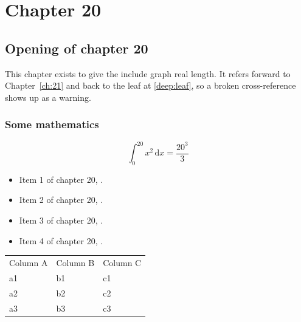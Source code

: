\chapter{Chapter 20}
\label{ch:20}
\section{Opening of chapter 20}
This chapter exists to give the include graph real length. It refers
forward to Chapter~\ref{ch:21} and back to the leaf
at \ref{deep:leaf}, so a broken cross-reference shows up as a warning.

\subsection{Some mathematics}
\begin{equation}
  \int_0^{20} x^{2} \, \mathrm{d}x = \frac{20^{3}}{3}
\end{equation}

\begin{itemize}
  \item Item 1 of chapter 20, .
  \item Item 2 of chapter 20, .
  \item Item 3 of chapter 20, .
  \item Item 4 of chapter 20, .
\end{itemize}

\begin{tabular}{lll}
  Column A & Column B & Column C \\
  a1 & b1 & c1 \\
  a2 & b2 & c2 \\
  a3 & b3 & c3 \\
\end{tabular}

